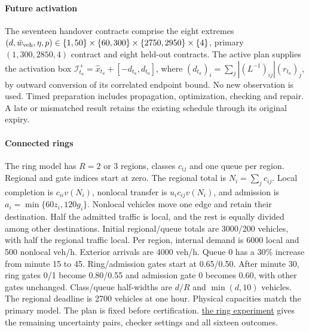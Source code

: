 \documentclass[preprint,12pt]{elsarticle}
\newcommand{\reproductiondetails}[1]{\href{https://github.com/AlienEslami/agentic-perimeter-runtime-certification/blob/main/paper/supporting_materials/REPRODUCING_THE_REDUCED_PAPER.md}{#1}}
\begin{document}
\paragraph{Future activation}
\label{supp:detail:sec:delayed-handover-results}
\label{app:sequential-handover}
The seventeen handover contracts comprise the eight extremes
$(d,\bar w_{\rm veh},\eta,p)\in\{1,50\}\times\{60,300\}\times
\{2750,2950\}\times\{4\}$, primary $(1,300,2850,4)$ contract and eight
held-out contracts. The active plan supplies the activation box
$\mathcal I_{t_a}^+=\widehat x_{t_a}+[-d_{t_a},d_{t_a}]$, where
$(d_{t_a})_i=\sum_j|(L^{-1})_{ij}|(r_{t_a})_j$, by outward conversion of its
correlated endpoint bound. No new observation is used. Timed preparation
includes propagation, optimization, checking and repair. A late or
mismatched result retains the existing schedule through its original expiry.

\paragraph{Connected rings}
\label{app:network-transfer}
The ring model has $R=2$ or $3$ regions, classes $c_{ij}$ and one
queue per region. Regional and gate indices start at zero. The regional
total is $N_i=\sum_jc_{ij}$. Local completion is $c_{ii}v(N_i)$, nonlocal
transfer is $u_i c_{ij}v(N_i)$, and admission is $a_i=\min\{60z_i,120g_i\}$. Nonlocal
vehicles move one edge and retain their destination. Half the admitted
traffic is local, and the rest is equally divided among other destinations.
Initial regional/queue totals are 3000/200 vehicles, with half the regional
traffic local. Per region, internal demand is 6000 local and 500 nonlocal
veh/h. Exterior arrivals are 4000 veh/h. Queue 0 has a 30\%
increase from minute 15 to 45. Ring/admission gates start at 0.65/0.50.
After minute 30, ring gates 0/1 become 0.80/0.55 and admission gate 0
becomes 0.60, with other gates unchanged. Class/queue half-widths are
$d/R$ and $\min(d,10)$ vehicles. The regional deadline is 2700 vehicles
at one hour. Physical capacities match the primary model. The plan is
fixed before certification. \reproductiondetails{the ring experiment}
gives the remaining uncertainty pairs, checker settings and all sixteen
outcomes.
\end{document}
